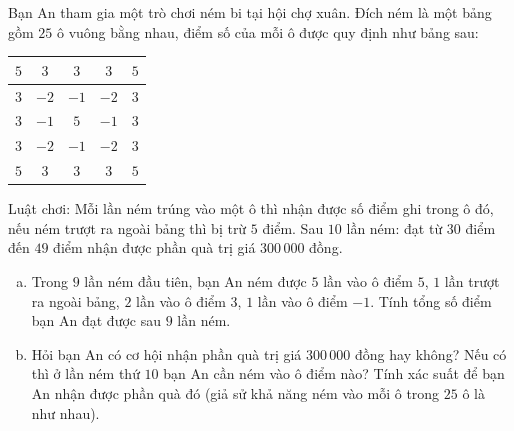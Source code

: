 \begin{bt}%
Bạn An tham gia một trò chơi ném bi tại hội chợ xuân. Đích ném là một bảng gồm $25$ ô vuông bằng nhau, điểm số của mỗi ô được quy định như bảng sau:
\begin{center}
\begin{tabular}{|c|c|c|c|c|}
    \hline
    $5$ & $3$ & $3$ & $3$ & $5$ \\
    \hline
    $3$ & $-2$ & $-1$ & $-2$ & $3$ \\
    \hline
    $3$ & $-1$ & $5$ & $-1$ & $3$ \\
    \hline
    $3$ & $-2$ & $-1$ & $-2$ & $3$ \\
    \hline
    $5$ & $3$ & $3$ & $3$ & $5$ \\
    \hline
\end{tabular}
\end{center}
Luật chơi: Mỗi lần ném trúng vào một ô thì nhận được số điểm ghi trong ô đó, nếu ném trượt ra ngoài bảng thì bị trừ $5$ điểm. Sau $10$ lần ném: đạt từ $30$ điểm đến $49$ điểm nhận được phần quà trị giá $300\,000$ đồng.
\begin{enumerate}[a)]
    \item Trong $9$ lần ném đầu tiên, bạn An ném được $5$ lần vào ô điểm $5$, $1$ lần trượt ra ngoài bảng, $2$ lần vào ô điểm $3$, $1$ lần vào ô điểm $-1$. Tính tổng số điểm bạn An đạt được sau $9$ lần ném.
    \item Hỏi bạn An có cơ hội nhận phần quà trị giá $300\,000$ đồng hay không? Nếu có thì ở lần ném thứ $10$ bạn An cần ném vào ô điểm nào? Tính xác suất để bạn An nhận được phần quà đó (giả sử khả năng ném vào mỗi ô trong $25$ ô là như nhau).
\end{enumerate}
\end{bt}

